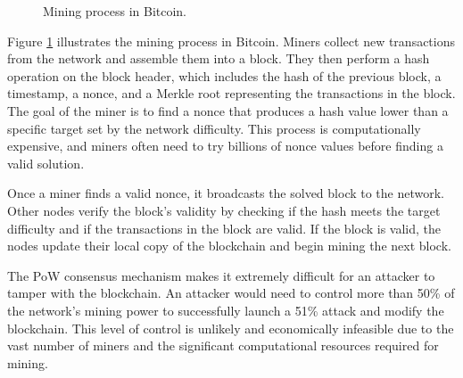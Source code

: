 \begin{figure}[ht]
\centering
{}
\caption{Mining process in Bitcoin.}
\label{fig:mining_process}
\end{figure}

Figure \ref{fig:mining_process} illustrates the mining process in Bitcoin. Miners collect new transactions from the network and assemble them into a block. They then perform a hash operation on the block header, which includes the hash of the previous block, a timestamp, a nonce, and a Merkle root representing the transactions in the block. The goal of the miner is to find a nonce that produces a hash value lower than a specific target set by the network difficulty. This process is computationally expensive, and miners often need to try billions of nonce values before finding a valid solution.

Once a miner finds a valid nonce, it broadcasts the solved block to the network. Other nodes verify the block's validity by checking if the hash meets the target difficulty and if the transactions in the block are valid. If the block is valid, the nodes update their local copy of the blockchain and begin mining the next block.

The PoW consensus mechanism makes it extremely difficult for an attacker to tamper with the blockchain. An attacker would need to control more than 50\% of the network's mining power to successfully launch a 51\% attack and modify the blockchain. This level of control is unlikely and economically infeasible due to the vast number of miners and the significant computational resources required for mining.

